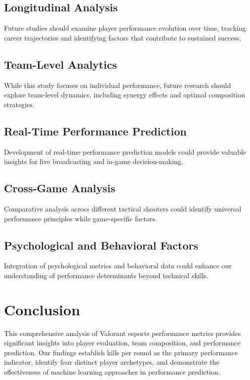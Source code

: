 \documentclass[11pt,a4paper]{article}
\begin{document}
\subsection{Longitudinal Analysis}

Future studies should examine player performance evolution over time, tracking career trajectories and identifying factors that contribute to sustained success.

\subsection{Team-Level Analytics}

While this study focuses on individual performance, future research should explore team-level dynamics, including synergy effects and optimal composition strategies.

\subsection{Real-Time Performance Prediction}

Development of real-time performance prediction models could provide valuable insights for live broadcasting and in-game decision-making.

\subsection{Cross-Game Analysis}

Comparative analysis across different tactical shooters could identify universal performance principles while game-specific factors.

\subsection{Psychological and Behavioral Factors}

Integration of psychological metrics and behavioral data could enhance our understanding of performance determinants beyond technical skills.

\section{Conclusion}

This comprehensive analysis of Valorant esports performance metrics provides significant insights into player evaluation, team composition, and performance prediction. Our findings establish kills per round as the primary performance indicator, identify four distinct player archetypes, and demonstrate the effectiveness of machine learning approaches in performance prediction.
\end{document}
